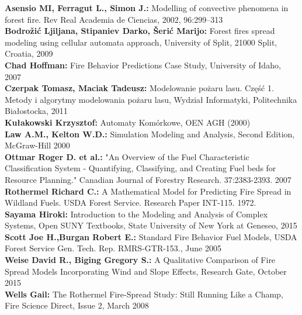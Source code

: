 \documentclass[a4paper, 11pt]{article}
\begin{document}
	\textbf{Asensio MI, Ferragut L., Simon J.:} Modelling of convective phenomena in forest fire. Rev Real Academia de Ciencias, 2002, 96:299–313\\
	\textbf{Bodrožić Ljiljana, Stipaniev Darko, Šerić Marijo:} Forest fires spread modeling using cellular automata approach, University of Split, 21000 Split, Croatia, 2009 \\
	\textbf{Chad Hoffman:} Fire Behavior Predictions Case Study, University of Idaho, 2007\\
	\textbf{Czerpak Tomasz, Maciak Tadeusz:} Modelowanie pożaru lasu. Część 1. Metody i algorytmy modelowania pożaru lasu, Wydział Informatyki, Politechnika Białostocka, 2011 \\
	\textbf{Kułakowski Krzysztof:} Automaty Komórkowe, OEN AGH (2000) \\
	\textbf{Law A.M., Kelton W.D.:} Simulation Modeling and Analysis, Second Edition, McGraw-Hill 2000\\
	\textbf{Ottmar Roger D. et al.:} "An Overview of the Fuel Characteristic Classification System - Quantifying, Classifying, and Creating Fuel beds for Resource Planning." Canadian Journal of Forestry Research. 37:2383-2393. 2007\\
	\textbf{Rothermel Richard C.:} A Mathematical Model for Predicting Fire Spread in Wildland Fuels. USDA Forest Service. Research Paper INT-115. 1972.\\
	\textbf{Sayama Hiroki:} Introduction to the Modeling and Analysis of Complex Systems, Open SUNY Textbooks, State University of New York at Geneseo, 2015\\	
	\textbf{Scott Joe H.,Burgan Robert E.:} Standard Fire Behavior Fuel Models, USDA Forest Service Gen. Tech. Rep. RMRS-GTR-153., June 2005\\	
	\textbf{Weise David R., Biging Gregory S.:} A Qualitative Comparison of Fire Spread Models Incorporating Wind and Slope Effects, Research Gate, October 2015\\
	\textbf{Wells Gail:} The Rothermel Fire-Spread Study: Still Running Like a Champ, Fire Science Direct, Issue 2, March 2008\\
	
	
	
	
\end{document}
